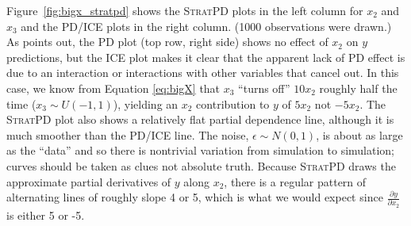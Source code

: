 \documentclass[12pt]{article}
\newcommand{\figref}[1]{Figure~\ref{#1}}
\newcommand{\spd}{\fontfamily{cmr}\textsc{\small StratPD}}
\begin{document}
\noindent \figref{fig:bigx_stratpd} shows the \spd{} plots in the left column for $x_2$ and $x_3$ and the PD/ICE plots in the right column. (1000 observations were drawn.) As \cite{ICE} points out, the PD plot (top row, right side) shows no effect of $x_2$ on $y$ predictions, but the ICE plot makes it clear that the apparent lack of PD effect is due to an interaction or interactions with other variables that cancel out. In this case, we know from Equation \eqref{eq:bigX} that $x_3$ ``turns off'' $10 x_2$ roughly half the time ($x_3 \sim U(-1,1)$), yielding an $x_2$ contribution to $y$ of $5 x_2$ not $-5 x_2$. The \spd{} plot also shows a relatively flat partial dependence line, although it is much smoother than the PD/ICE line. The noise, $\epsilon \sim N(0,1)$, is about as large as the ``data'' and so there is nontrivial variation from simulation to simulation; curves should be taken as clues not absolute truth. Because \spd{} draws the approximate partial derivatives of $y$ along $x_2$, there is a regular pattern of alternating lines of roughly slope 4 or 5, which is what we would expect since $\frac{\partial y}{\partial x_2}$ is either 5 or -5.
\end{document}
